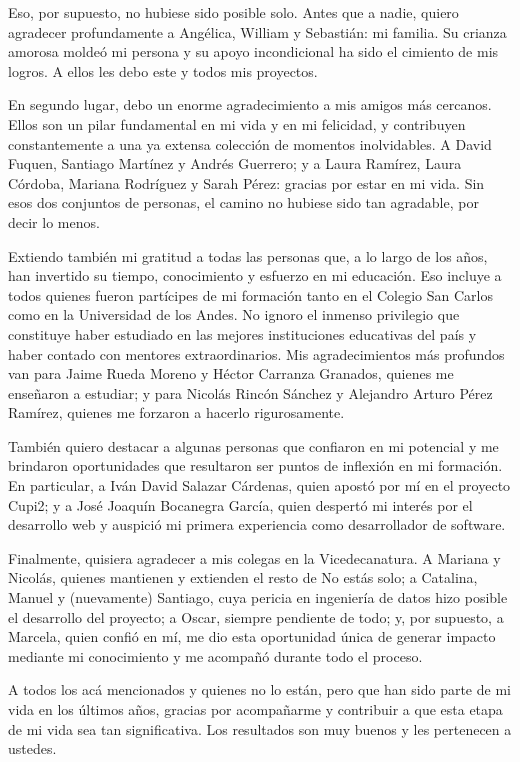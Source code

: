 Eso, por supuesto, no hubiese sido posible solo. Antes que a nadie, quiero agradecer profundamente a Angélica, William y Sebastián: mi familia. Su crianza amorosa moldeó mi persona y su apoyo incondicional ha sido el cimiento de mis logros. A ellos les debo este y todos mis proyectos.

En segundo lugar, debo un enorme agradecimiento a mis amigos más cercanos. Ellos son un pilar fundamental en mi vida y en mi felicidad, y contribuyen constantemente a una ya extensa colección de momentos inolvidables. A David Fuquen, Santiago Martínez y Andrés Guerrero; y a Laura Ramírez, Laura Córdoba, Mariana Rodríguez y Sarah Pérez: gracias por estar en mi vida. Sin esos dos conjuntos de personas, el camino no hubiese sido tan agradable, por decir lo menos.

Extiendo también mi gratitud a todas las personas que, a lo largo de los años, han invertido su tiempo, conocimiento y esfuerzo en mi educación. Eso incluye a todos quienes fueron partícipes de mi formación tanto en el Colegio San Carlos como en la Universidad de los Andes. No ignoro el inmenso privilegio que constituye haber estudiado en las mejores instituciones educativas del país y haber contado con mentores extraordinarios. Mis agradecimientos más profundos van para Jaime Rueda Moreno y Héctor Carranza Granados, quienes me enseñaron a estudiar; y para Nicolás Rincón Sánchez y Alejandro Arturo Pérez Ramírez, quienes me forzaron a hacerlo rigurosamente.

También quiero destacar a algunas personas que confiaron en mi potencial y me brindaron oportunidades que resultaron ser puntos de inflexión en mi formación. En particular, a Iván David Salazar Cárdenas, quien apostó por mí en el proyecto Cupi2; y a José Joaquín Bocanegra García, quien despertó mi interés por el desarrollo web y auspició mi primera experiencia como desarrollador de software.

Finalmente, quisiera agradecer a mis colegas en la Vicedecanatura. A Mariana y Nicolás, quienes mantienen y extienden el resto de No estás solo; a Catalina, Manuel y (nuevamente) Santiago, cuya pericia en ingeniería de datos hizo posible el desarrollo del proyecto; a Oscar, siempre pendiente de todo; y, por supuesto, a Marcela, quien confió en mí, me dio esta oportunidad única de generar impacto mediante mi conocimiento y me acompañó durante todo el proceso.

A todos los acá mencionados y quienes no lo están, pero que han sido parte de mi vida en los últimos años, gracias por acompañarme y contribuir a que esta etapa de mi vida sea tan significativa. Los resultados son muy buenos y les pertenecen a ustedes.
